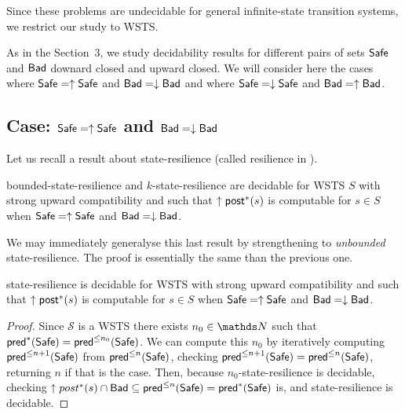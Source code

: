 


Since these problems are undecidable for general infinite-state transition systems, we restrict our study to WSTS.

As in the Section~3, we study decidability results for different pairs of sets $\textsf{Safe}$ and $\textsf{Bad}$ downard closed and upward closed. We will consider here the cases where 
$\textsf{Safe} = \uparrow \textsf{Safe}$ and $\textsf{Bad} = \downarrow \textsf{Bad}$ 
and where 
$\textsf{Safe} = \downarrow \textsf{Safe}$ and $\textsf{Bad} = \uparrow \textsf{Bad}$.


\subsection{Case: $\textsf{Safe} = \uparrow \textsf{Safe}$ and $\textsf{Bad} = \downarrow \textsf{Bad}$}



Let us recall a result about state-resilience (called resilience in \cite{DBLP:conf/gg/Ozkan22,DBLP:journals/corr/abs-2108-00889}).

\begin{theorem}\cite{DBLP:conf/gg/Ozkan22,DBLP:journals/corr/abs-2108-00889}\label{ref ozkan}
{\sc bounded-state-resilience} and {\sc $k$-state-resilience} are decidable for WSTS $S$ with strong upward compatibility and such that $\uparrow \textsf{post}^*(s)$ is computable for $s \in S$
when
$\textsf{Safe}=\uparrow \textsf{Safe}$
and $\textsf{Bad}=\downarrow \textsf{Bad}$.
\end{theorem}

We may immediately generalyse this last result by strengthening to \emph{unbounded} state-resilience. The proof is essentially the same than the previous one.

\begin{corollary}\label{postcomputable}
{\sc state-resilience} is decidable for WSTS with strong upward compatibility and such that $\uparrow \textsf{post}^*(s)$ is computable for $s \in S$
when
$\textsf{Safe}=\uparrow \textsf{Safe}$
and $\textsf{Bad}=\downarrow \textsf{Bad}$.
\end{corollary}

\begin{proof}
Since $\mathscr{S}$ is a WSTS there exists $n_0 \in \N$ such that
$\textsf{pred}^*(\textsf{Safe}) =  \textsf{pred}^{\leq n_0}(\textsf{Safe})$. We can compute this $n_0$ by iteratively computing 
$\textsf{pred}^{\leq n+1}(\textsf{Safe})$ from $\textsf{pred}^{\leq n}(\textsf{Safe})$, checking 
$\textsf{pred}^{\leq n+1}(\textsf{Safe}) = \textsf{pred}^{\leq n}(\textsf{Safe})$, 
returning $n$ if that is the case.
Then, because $n_0$-state-resilience is decidable, 
checking $\uparrow post^*(s) \cap \textsf{Bad} \subseteq \textsf{pred}^{\leq n}(\textsf{Safe}) = \textsf{pred}^*(\textsf{Safe})$ is,
and state-resilience is decidable.
\end{proof}

